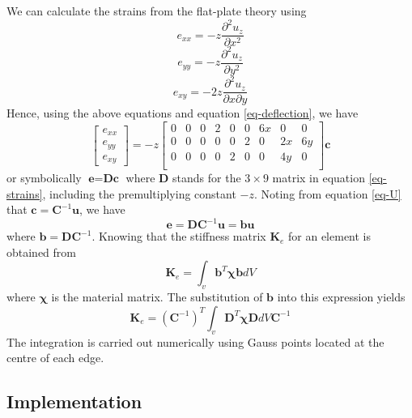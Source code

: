 \documentclass{llncs}
\begin{document}
We can calculate the strains from the flat-plate theory using
\begin{equation}
e_{xx} = -z \frac{\partial^2u_z}{\partial x^2}
\end{equation} 
\begin{equation}
e_{yy} = -z \frac{\partial^2u_z}{\partial y^2}
\end{equation} 
\begin{equation}
e_{xy} = -2z \frac{\partial^2u_z}{\partial x \partial y}
\end{equation} 
Hence, using the above equations and equation \ref{eq-deflection}, we have
\begin{equation}
\begin{bmatrix}
e_{xx} \\
e_{yy} \\
e_{xy}
\end{bmatrix}
= 
-z
\begin{bmatrix}
0 & 0 & 0 & 2 & 0 & 0 & 6x & 0 & 0 \\
0 & 0 & 0 & 0 & 0 & 2 & 0 & 2x & 6y \\
0 & 0 & 0 & 0 & 2 & 0 & 0 & 4y & 0 \\
\end{bmatrix}
\textbf{c}
\label{eq-strains}
\end{equation} 
or symbolically $\textbf{e} = \textbf{Dc}$ where $\textbf{D}$ stands for the $3\times 9$ matrix in equation \ref{eq-strains}, including the premultiplying constant $-z$. Noting from equation \ref{eq-U} that $\textbf{c} = \textbf{C}^{-1}\textbf{u}$, we have 
\begin{equation}
\textbf{e} = \textbf{DC}^{-1}\textbf{u} = \textbf{bu}
\end{equation} 
where $\textbf{b} = \textbf{DC}^{-1}$. 
Knowing that the stiffness matrix $\textbf{K}_e$ for an element is obtained from
\begin{equation}
\textbf{K}_e = \int_v \textbf{b}^{T} \boldsymbol\chi \textbf{b} dV
\end{equation} 
where $\boldsymbol\chi$ is the material matrix. The substitution of $\textbf{b}$ into this expression yields
\begin{equation}
\textbf{K}_e = (\textbf{C}^{-1})^T \int_v \textbf{D}^{T} \boldsymbol\chi \textbf{D} dV \textbf{C}^{-1}
\end{equation} 
The integration is carried out numerically using Gauss points located at the centre of each edge. 

\subsection{Implementation}
\end{document}

